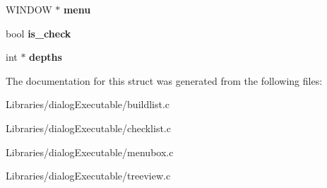 \begin{DoxyCompactItemize}
\item 
W\+I\+N\+D\+OW $\ast$ {\bfseries menu}\hypertarget{struct_a_l_l___d_a_t_a_a077954714764531259a52db75d7dd548}{}\label{struct_a_l_l___d_a_t_a_a077954714764531259a52db75d7dd548}

\item 
bool {\bfseries is\+\_\+check}\hypertarget{struct_a_l_l___d_a_t_a_a221615d2bf614221821678fd5b54c0e2}{}\label{struct_a_l_l___d_a_t_a_a221615d2bf614221821678fd5b54c0e2}

\item 
int $\ast$ {\bfseries depths}\hypertarget{struct_a_l_l___d_a_t_a_a2e3f9c8d2747c681536200c9cd7ef543}{}\label{struct_a_l_l___d_a_t_a_a2e3f9c8d2747c681536200c9cd7ef543}

\end{DoxyCompactItemize}


The documentation for this struct was generated from the following files\+:\begin{DoxyCompactItemize}
\item 
Libraries/dialog\+Executable/buildlist.\+c\item 
Libraries/dialog\+Executable/checklist.\+c\item 
Libraries/dialog\+Executable/menubox.\+c\item 
Libraries/dialog\+Executable/treeview.\+c\end{DoxyCompactItemize}
